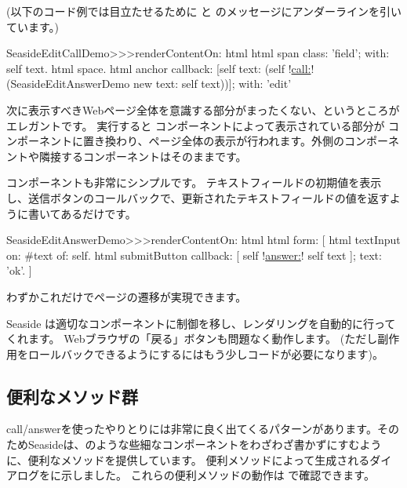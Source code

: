 \documentclass[a4paper,10pt,twoside]{book}
\begin{document}
(以下のコード例では目立たせるために  と  のメッセージにアンダーラインを引いています。)

\begin{code}{}
SeasideEditCallDemo>>>renderContentOn: html 
	html span
		class: 'field';
		with: self text.
	html space.
	html anchor
		callback: [self text: (self !\underline{call:}! (SeasideEditAnswerDemo new text: self text))];
		with: 'edit'
\end{code}{}

次に表示すべきWebページ全体を意識する部分がまったくない、というところがエレガントです。
実行すると  コンポーネントによって表示されている部分が  コンポーネントに置き換わり、ページ全体の表示が行われます。外側のコンポーネントや隣接するコンポーネントはそのままです。


 コンポーネントも非常にシンプルです。
テキストフィールドの初期値を表示し、送信ボタンのコールバックで、更新されたテキストフィールドの値を返すように書いてあるだけです。

\begin{code}{}
SeasideEditAnswerDemo>>>renderContentOn: html
	html form: [
		html textInput
			on: #text of: self.
		html submitButton
			callback: [ self !\underline{answer:}! self text ];
			text: 'ok'.
		]
\end{code}{}

わずかこれだけでページの遷移が実現できます。

Seaside は適切なコンポーネントに制御を移し、レンダリングを自動的に行ってくれます。
Webブラウザの「戻る」ボタンも問題なく動作します。 (ただし副作用をロールバックできるようにするにはもう少しコードが必要になります)。

\subsection{便利なメソッド群}

call/answerを使ったやりとりには非常に良く出てくるパターンがあります。そのためSeasideは、のような些細なコンポーネントをわざわざ書かずにすむように、便利なメソッドを提供しています。
便利メソッドによって生成されるダイアログをに示しました。
これらの便利メソッドの動作は で確認できます。
\end{document}
